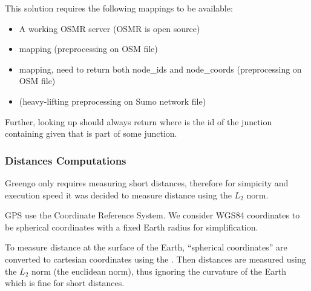 \documentclass[letterpaper,10pt,english]{sphinxmanual}
\begin{document}
This solution requires the following mappings to be available:
\begin{itemize}
\item {} 
A working OSMR server (OSMR is open source)

\item {} 
 mapping (preprocessing on OSM file)

\item {} 
 mapping, need to return both node\_ids and node\_coords (preprocessing on OSM file)

\item {} 
 (heavy-lifting preprocessing on Sumo network file)

\end{itemize}

Further, looking up  should always return  where  is the id of the junction containing  given that  is part of some junction.


\subsubsection{Distances Computations}
\label{\detokenize{microservices/vehicle_localization/algorithms:distances-computations}}
Greengo only requires measuring short distances, therefore for simpicity and execution speed it was decided to measure distance using the \(L_2\) norm.

GPS use the  Coordinate Reference System.
We consider WGS84 coordinates to be spherical coordinates with a fixed Earth radius for simplification.

To measure distance at the surface of the Earth, “spherical coordinates” are converted to cartesian coordinates using the .
Then distances are measured using the \(L_2\) norm (the euclidean norm), thus ignoring the curvature of the Earth which is fine for short distances.
\end{document}
